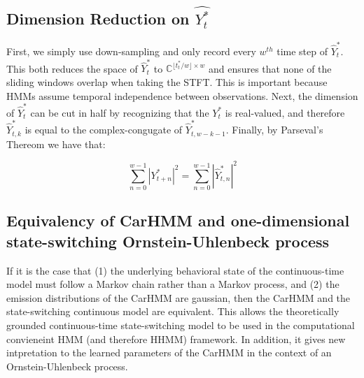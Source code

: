 \iffalse


\subsection{Dimension Reduction on $\hat{Y_t^*}$}

First, we simply use down-sampling and only record every $w^{th}$ time step of $\hat{Y}_t^*$. This both reduces the space of $\hat{Y}_t^*$ to $\mathbb{C}^{\lfloor t^*_t / w \rfloor \times w}$ and ensures that none of the sliding windows overlap when taking the STFT. This is important because HMMs assume temporal independence between observations. Next, the dimension of $\hat{Y}_t^*$ can be cut in half by recognizing that the $Y_t^*$ is real-valued, and therefore $\hat{Y}_{t,k}^*$ is equal to the complex-congugate of $\hat{Y}_{t,w-k-1}^*$. Finally, by Parseval's Thereom we have that:

$$\sum_{n = 0}^{w-1} |Y^*_{t+n}|^2 = \sum_{n = 0}^{w-1} |\hat{Y}^*_{t,n}|^2$$

\subsection{Equivalency of CarHMM and one-dimensional state-switching Ornstein-Uhlenbeck process}

If it is the case that (1) the underlying behavioral state of the continuous-time model must follow a Markov chain rather than a Markov process, and (2) the emission distributions of the CarHMM are gaussian, then the CarHMM and the state-switching continuous model are equivalent. This allows the theoretically grounded continuous-time state-switching model to be used in the computational convieneint HMM (and therefore HHMM) framework. In addition, it gives new intpretation to the learned parameters of the CarHMM in the context of an Ornstein-Uhlenbeck process.

